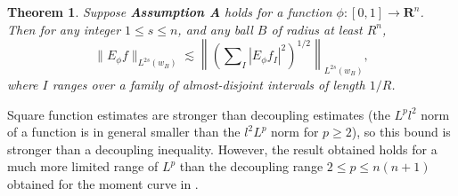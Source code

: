 \documentclass[12pt]{article}
\newtheorem{theorem}{Theorem}
\begin{document}
\begin{theorem} \label{thm:2}
    Suppose {\normalfont \textbf{Assumption A}} holds for a function $\phi: [0,1] \to \mathbf{R}^n$. Then for any integer $1 \leq s \leq n$, and any ball $B$ of radius at least $R^n$,
    \[ \| E_\phi f \|_{L^{2s}(w_B)} \lesssim \left\| \left( \sum\nolimits_I | E_\phi f_I |^2 \right)^{1/2} \right\|_{L^{2s}(w_B)}, \]
    where $I$ ranges over a family of almost-disjoint intervals of length $1/R$.
\end{theorem}

Square function estimates are stronger than decoupling estimates (the $L^p l^2$ norm of a function is in general smaller than the $l^2 L^p$ norm for $p \geq 2$), so this bound is stronger than a decoupling inequality. However, the result obtained holds for a much more limited range of $L^p$ than the decoupling range $2 \leq p \leq n(n+1)$ obtained for the moment curve in \cite{uiwadawoidjwaoi}.
\end{document}
